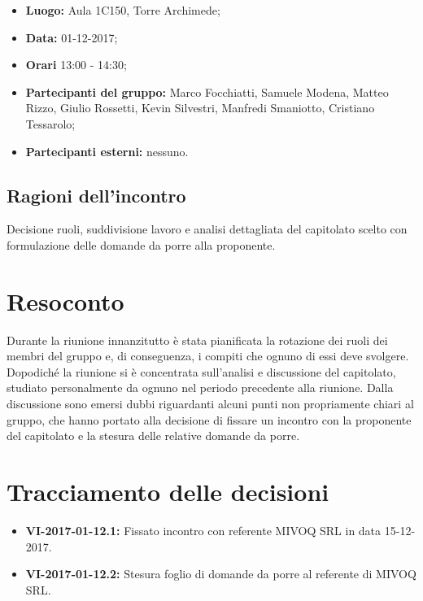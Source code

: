 \documentclass[openany,12pt,a4paper]{article}
\begin{document}
	\begin{itemize} 
	    \item \textbf{Luogo:} Aula 1C150, Torre Archimede;
	    \item \textbf{Data:} 01-12-2017;
	    \item \textbf{Orari} 13:00 - 14:30;
	    \item \textbf{Partecipanti del gruppo:} Marco Focchiatti, Samuele Modena, Matteo Rizzo, Giulio Rossetti, Kevin Silvestri, Manfredi Smaniotto, Cristiano Tessarolo;
	    \item \textbf{Partecipanti esterni:} nessuno.
	\end{itemize}
	
	\subsection{Ragioni dell'incontro}
	
	Decisione ruoli, suddivisione lavoro e analisi dettagliata del capitolato scelto con formulazione delle domande da porre alla proponente.

	\section{Resoconto}
	
	Durante la riunione innanzitutto è stata pianificata la rotazione dei ruoli dei membri del gruppo e, di conseguenza, i compiti che ognuno di essi deve svolgere. Dopodiché la riunione si è concentrata sull'analisi e discussione del capitolato, studiato personalmente da ognuno nel periodo precedente alla riunione. Dalla discussione sono emersi dubbi riguardanti alcuni punti non propriamente chiari al gruppo, che hanno portato alla decisione di fissare un incontro con la proponente del capitolato e la stesura  delle relative domande da porre.  
	
	\section{Tracciamento delle decisioni}
	
	\begin{itemize}
	    \item \textbf{VI-2017-01-12.1:} Fissato incontro con referente MIVOQ SRL in data 15-12-2017.
	    \item \textbf{VI-2017-01-12.2:} Stesura foglio di domande da porre al referente di MIVOQ SRL.
	\end{itemize}	

	
\end{document}
